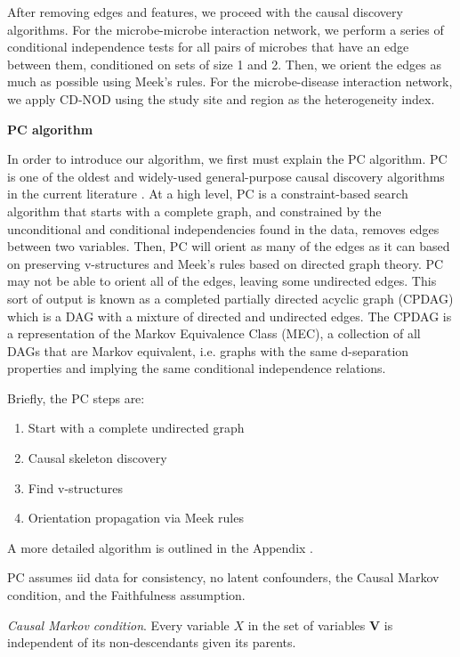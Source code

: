 \documentclass[12pt,letterpaper]{article}
\begin{document}
After removing edges and features, we proceed with the causal discovery algorithms. For the microbe-microbe interaction network, we perform a series of conditional independence tests for all pairs of microbes that have an edge between them, conditioned on sets of size 1 and 2. Then, we orient the edges as much as possible using Meek’s rules. For the microbe-disease interaction network, we apply CD-NOD using the study site and region as the heterogeneity index. \newline

\textbf{PC algorithm}

In order to introduce our algorithm, we first must explain the PC algorithm. PC is one of the oldest and widely-used general-purpose causal discovery algorithms in the current literature \citep{glymour2019review}. At a high level, PC is a constraint-based search algorithm that starts with a complete graph, and constrained by the unconditional and conditional independencies found in the data, removes edges between two variables. Then, PC will orient as many of the edges as it can based on preserving v-structures and Meek’s rules based on directed graph theory. PC may not be able to orient all of the edges, leaving some undirected edges. This sort of output is known as a completed partially directed acyclic graph (CPDAG) which is a DAG with a mixture of directed and undirected edges. The CPDAG is a representation of the Markov Equivalence Class (MEC), a collection of all DAGs that are Markov equivalent, i.e. graphs with the same d-separation properties and implying the same conditional independence relations. 

Briefly, the PC steps are: 
\begin{enumerate}
    \item Start with a complete undirected graph
    \item Causal skeleton discovery
    \item Find v-structures
    \item Orientation propagation via Meek rules
\end{enumerate}

A more detailed algorithm is outlined in the Appendix \citep{spirtes2000causation}. 

PC assumes iid data for consistency, no latent confounders, the Causal Markov condition, and the Faithfulness assumption. 

\textit{Causal Markov condition}. Every variable $X$ in the set of variables $\textbf{V}$ is independent of its non-descendants given its parents. 
\end{document}

